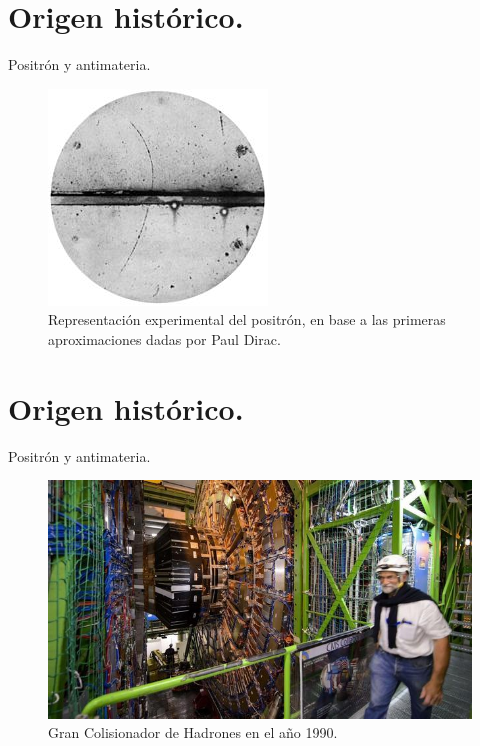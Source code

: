\documentclass{beamer}
\begin{document}
\section{Origen histórico.}

\begin{frame}{Positrón y antimateria.}
\begin{figure}
    \centering
    \includegraphics[scale=.60]{positron.jpg}
    \caption{Representación experimental del positrón, en base a las primeras aproximaciones dadas por Paul Dirac.}
    \label{fig:positron}
\end{figure}


\end{frame}
\section{Origen histórico.}

\begin{frame}{Positrón y antimateria.}
\begin{figure}
    \centering
    \includegraphics[scale=.50]{lhc.jpg}
    \caption{Gran Colisionador de Hadrones en el año 1990.}
    \label{fig:positron}
\end{figure}


\end{frame}
\end{document}
